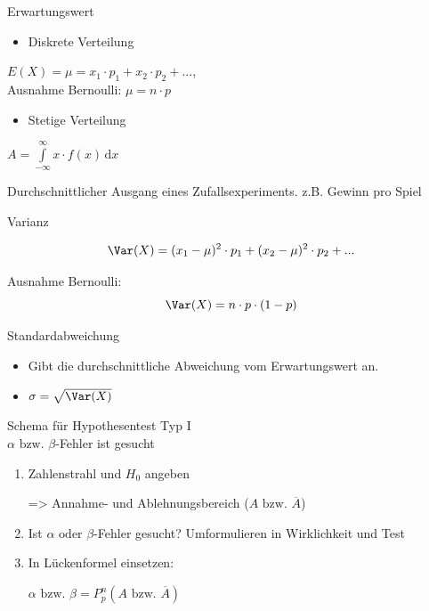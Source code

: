 \documentclass[paper=a6,ngerman,twoside=true,fontsize=14pt, parskip = half]{scrartcl}
\begin{document}
\begin{frage}
	Erwartungswert
\end{frage}
\begin{antwort}
	\begin{itemize}
		\item Diskrete Verteilung
	\end{itemize}
	$E(X)=\mu=x_1 \cdot p_1 + x_2 \cdot p_2 + ...$,\\
	Ausnahme Bernoulli: $\mu=n \cdot p$
	\begin{itemize}
		\item Stetige Verteilung
	\end{itemize}
	$A=\displaystyle\int\limits_{-\infty}^{\infty} \!x\cdot f(x) \, \mathrm{d}x$
	
	Durchschnittlicher Ausgang eines Zufallsexperiments.
	z.B. Gewinn pro Spiel
\end{antwort}	
\begin{frage}
	Varianz
	
\end{frage}
\begin{antwort}
	 \[\Var(X)=(x_1-\mu)^2 \cdot p_1+(x_2-\mu)^2 \cdot p_2+...\]
	\bigskip

	Ausnahme Bernoulli: \[\Var(X)=n \cdot p \cdot (1-p)\]	
\end{antwort}	
\begin{frage}
	Standardabweichung
	
\end{frage}
\begin{antwort}
	\begin{itemize}
		\item Gibt die durchschnittliche Abweichung vom Erwartungswert an.		
		\item $\sigma=\sqrt{\Var(X)}$	
	\end{itemize}	
\end{antwort}	
\begin{frage}
	Schema für Hypothesentest Typ I\\
	$\alpha \text{ bzw. }\beta$-Fehler ist gesucht
	
\end{frage}
\begin{antwort}
	\begin{enumerate}
		\item Zahlenstrahl und $H_0$ angeben
		
		=> Annahme- und Ablehnungsbereich  ($A \text{ bzw. }\overline{A}$)	
		\item Ist  $\alpha \text{ oder }\beta$-Fehler gesucht? Umformulieren in Wirklichkeit und Test
		\item In Lückenformel einsetzen: 
		
		$\alpha \text{ bzw. }\beta=P^n_p(A\text{ bzw. }\overline{A})$	
	\end{enumerate}
	
\end{antwort}	
\end{document}
